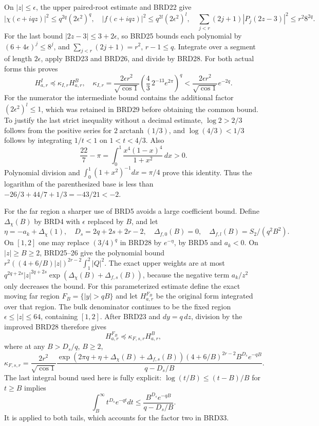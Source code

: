 On $|z|\leq\epsilon$, the upper paired-root estimate and BRD22
give
\[
 |\chi(c+iqz)|^2\leq q^{2q}(2\epsilon^2)^q,
 \quad |f(c+iqz)|^2\leq q^{2l}(2\epsilon^2)^l,
 \quad\sum_{j<r}(2j+1)|P_j(2z-3)|^2\leq r^2 8^{2q}.
\tag{BRD29}
\]
For the last bound $|2z-3|\leq3+2\epsilon$, so BRD25 bounds
each polynomial by $(6+4\epsilon)^j\leq8^j$, and
$\sum_{j<r}(2j+1)=r^2$, $r-1\leq q$. Integrate over a
segment of length $2\epsilon$, apply BRD23 and BRD26, and
divide by BRD28. For both actual forms this proves
\[
 H_{a,r}^I\preceq\kappa_{I,r}H_{a,r}^B,
 \quad\kappa_{I,r}=\frac{2\epsilon r^2}{\sqrt{\cos1}}
             \left(\frac43\,2^{-13}e^{2\pi}\right)^q
 <\frac{2\epsilon r^2}{\sqrt{\cos1}}e^{-2q}.
\tag{BRD30}
\]
For the numerator the intermediate bound contains the additional
factor $(2\epsilon^2)^l\leq1$, which was retained in BRD29
before obtaining the common bound. To justify the last strict
inequality without a decimal estimate, $\log2>2/3$ follows
from the positive series for $2\operatorname{arctanh}(1/3)$,
and $\log(4/3)<1/3$ follows by integrating $1/t<1$ on
$1<t<4/3$. Also
\[
 \frac{22}7-\pi=\int_0^1\frac{x^4(1-x)^4}{1+x^2}\,dx>0.
\]
Polynomial division and $\int_0^1(1+x^2)^{-1}dx=\pi/4$
prove this identity. Thus the logarithm of the parenthesized
base is less than $-26/3+44/7+1/3=-43/21<-2$.

For the far region a sharper use of BRD5 avoids a large
coefficient bound. Define $\Delta_\chi(B)$ by BRD4 with
$\epsilon$ replaced by $B$, and let
\[
 \eta=-a_k+\Delta_\chi(1),\quad
 D_s=2q+2s+2r-2,\quad
 \Delta_{f,0}(B)=0,\quad
 \Delta_{f,l}(B)=S_2/(q^2B^2).
\tag{BRD31}
\]
On $[1,2]$ one may replace $(3/4)^q$ in BRD28 by $e^{-\eta}$,
by BRD5 and $a_k<0$. On $|z|\geq B\geq2$, BRD25--26 give
the polynomial bound
$r^2((4+6/B)|z|)^{2r-2}\int_1^2|Q|^2$.
The exact upper weights are at most
$q^{2q+2s}|z|^{2q+2s}
\exp(\Delta_\chi(B)+\Delta_{f,s}(B))$,
because the negative term $a_k/z^2$ only decreases the bound.
For this parameterized estimate define the exact moving far
region $F_B=\{|y|>qB\}$ and let $H_{a,r}^{F_B}$ be the
original form integrated over that region. The bulk denominator
continues to be the fixed region
$\epsilon\leq|z|\leq64$, containing $[1,2]$.
After BRD23 and $dy=q\,dz$, division by the improved BRD28
therefore gives
\[
 H_{a,r}^{F_B}\preceq\kappa_{F,s,r}H_{a,r}^B,
\tag{BRD32}
\]
where at any $B>D_s/q$, $B\geq2$,
\[
 \kappa_{F,s,r}=
 \frac{2r^2}{\sqrt{\cos1}}
 \frac{\exp(2\pi q+\eta+\Delta_\chi(B)+\Delta_{f,s}(B))
 (4+6/B)^{2r-2}B^{D_s}e^{-qB}}{q-D_s/B}.
\tag{BRD33}
\]
The last integral bound used here is fully explicit:
$\log(t/B)\leq(t-B)/B$ for $t\geq B$ implies
\[
 \int_B^\infty t^{D_s}e^{-qt}dt
       \leq\frac{B^{D_s}e^{-qB}}{q-D_s/B}.
\tag{BRD34}
\]
It is applied to both tails, which accounts for the factor two
in BRD33.

